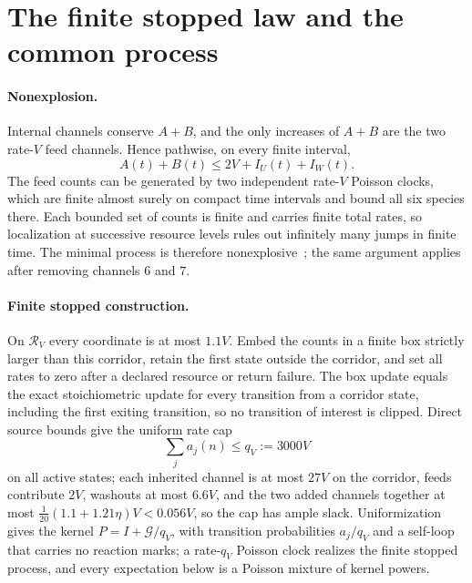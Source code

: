 \documentclass[11pt,a4paper]{article}
\theoremstyle{plain}
\theoremstyle{definition}
\theoremstyle{remark}
\newcommand{\G}{\mathcal G}
\newcommand{\R}{\mathcal R_V}
\begin{document}
\section{The finite stopped law and the common process}\label{sec:formal}

\paragraph{Nonexplosion.}
Internal channels conserve $A+B$, and the only increases of $A+B$ are the two rate-$V$ feed channels. Hence pathwise, on every finite interval,
\begin{equation}\label{eq:nonexplosion}
 A(t)+B(t)\le2V+I_U(t)+I_W(t).
\end{equation}
The feed counts can be generated by two independent rate-$V$ Poisson clocks, which are finite almost surely on compact time intervals and bound all six species there. Each bounded set of counts is finite and carries finite total rates, so localization at successive resource levels rules out infinitely many jumps in finite time. The minimal process is therefore nonexplosive~\citep{anderson2015}; the same argument applies after removing channels $6$ and $7$.

\paragraph{Finite stopped construction.}
On $\R$ every coordinate is at most $1.1V$. Embed the counts in a finite box strictly larger than this corridor, retain the first state outside the corridor, and set all rates to zero after a declared resource or return failure. The box update equals the exact stoichiometric update for every transition from a corridor state, including the first exiting transition, so no transition of interest is clipped. Direct source bounds give the uniform rate cap
\begin{equation}\label{eq:clock}
 \sum_ja_j(n)\le q_V:=3000V
\end{equation}
on all active states; each inherited channel is at most $27V$ on the corridor, feeds contribute $2V$, washouts at most $6.6V$, and the two added channels together at most $\frac1{20}(1.1+1.21\eta)V<0.056V$, so the cap has ample slack. Uniformization~\citep{jensen1953,grassmann1977} gives the kernel $P=I+\G/q_V$, with transition probabilities $a_j/q_V$ and a self-loop that carries no reaction marks; a rate-$q_V$ Poisson clock realizes the finite stopped process, and every expectation below is a Poisson mixture of kernel powers.
\end{document}
